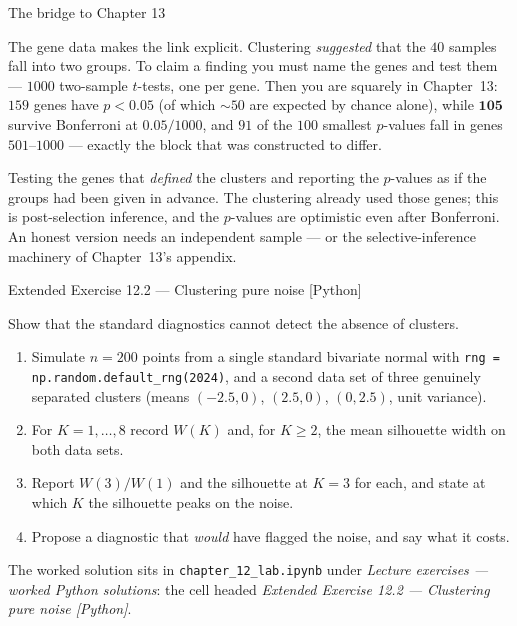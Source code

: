 \documentclass[aspectratio=169,11pt]{beamer}
\begin{document}
\begin{frame}{The bridge to Chapter 13}
  \begin{takeaway}
    The gene data makes the link explicit. Clustering \emph{suggested} that the $40$
    samples fall into two groups. To claim a finding you must name the genes and test them
    --- $1000$ two-sample $t$-tests, one per gene. Then you are squarely in Chapter~13:
    $159$ genes have $p<0.05$ (of which $\sim 50$ are expected by chance alone), while
    $\mathbf{105}$ survive Bonferroni at $0.05/1000$, and $91$ of the $100$ smallest
    $p$-values fall in genes $501$--$1000$ --- exactly the block that was constructed to
    differ.
  \end{takeaway}
  \begin{mistake}
    Testing the genes that \emph{defined} the clusters and reporting the $p$-values as if
    the groups had been given in advance. The clustering already used those genes; this is
    post-selection inference, and the $p$-values are optimistic even after Bonferroni.
    An honest version needs an independent sample --- or the selective-inference machinery
    of Chapter~13's appendix.
  \end{mistake}
\end{frame}

\begin{frame}{Extended Exercise 12.2 --- Clustering pure noise [Python]}
\begin{longexercise}
  Show that the standard diagnostics cannot detect the absence of clusters.
  \begin{enumerate}
    \item Simulate $n=200$ points from a single standard bivariate normal with
          \texttt{rng = np.random.default\_rng(2024)}, and a second data set of three
          genuinely separated clusters (means $(-2.5,0)$, $(2.5,0)$, $(0,2.5)$, unit
          variance).
    \item For $K=1,\dots,8$ record $W(K)$ and, for $K\ge2$, the mean silhouette width on
          both data sets.
    \item Report $W(3)/W(1)$ and the silhouette at $K=3$ for each, and state at which $K$
          the silhouette peaks on the noise.
    \item Propose a diagnostic that \emph{would} have flagged the noise, and say what it
          costs.
  \end{enumerate}
\end{longexercise}
\begin{labnote}
  The worked solution sits in \texttt{chapter\_12\_lab.ipynb} under
  \emph{Lecture exercises --- worked Python solutions}: the cell headed
  \emph{Extended Exercise 12.2 --- Clustering pure noise [Python]}.
\end{labnote}
\end{frame}
\end{document}
